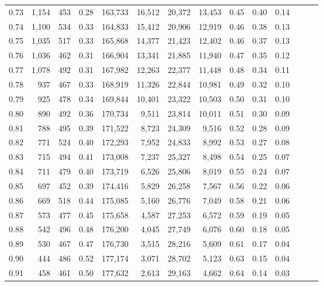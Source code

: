 \begin{tabular}{rrrrrrrrrrrrrr}
0.73 &  1,154 &  453 &  0.28 &  163,733 &   16,512 &  20,372 &  13,453 &  0.45 &  0.40 &      0.14 \\
0.74 &  1,100 &  534 &  0.33 &  164,833 &   15,412 &  20,906 &  12,919 &  0.46 &  0.38 &      0.13 \\
0.75 &  1,035 &  517 &  0.33 &  165,868 &   14,377 &  21,423 &  12,402 &  0.46 &  0.37 &      0.13 \\
0.76 &  1,036 &  462 &  0.31 &  166,904 &   13,341 &  21,885 &  11,940 &  0.47 &  0.35 &      0.12 \\
0.77 &  1,078 &  492 &  0.31 &  167,982 &   12,263 &  22,377 &  11,448 &  0.48 &  0.34 &      0.11 \\
0.78 &    937 &  467 &  0.33 &  168,919 &   11,326 &  22,844 &  10,981 &  0.49 &  0.32 &      0.10 \\
0.79 &    925 &  478 &  0.34 &  169,844 &   10,401 &  23,322 &  10,503 &  0.50 &  0.31 &      0.10 \\
0.80 &    890 &  492 &  0.36 &  170,734 &    9,511 &  23,814 &  10,011 &  0.51 &  0.30 &      0.09 \\
0.81 &    788 &  495 &  0.39 &  171,522 &    8,723 &  24,309 &   9,516 &  0.52 &  0.28 &      0.09 \\
0.82 &    771 &  524 &  0.40 &  172,293 &    7,952 &  24,833 &   8,992 &  0.53 &  0.27 &      0.08 \\
0.83 &    715 &  494 &  0.41 &  173,008 &    7,237 &  25,327 &   8,498 &  0.54 &  0.25 &      0.07 \\
0.84 &    711 &  479 &  0.40 &  173,719 &    6,526 &  25,806 &   8,019 &  0.55 &  0.24 &      0.07 \\
0.85 &    697 &  452 &  0.39 &  174,416 &    5,829 &  26,258 &   7,567 &  0.56 &  0.22 &      0.06 \\
0.86 &    669 &  518 &  0.44 &  175,085 &    5,160 &  26,776 &   7,049 &  0.58 &  0.21 &      0.06 \\
0.87 &    573 &  477 &  0.45 &  175,658 &    4,587 &  27,253 &   6,572 &  0.59 &  0.19 &      0.05 \\
0.88 &    542 &  496 &  0.48 &  176,200 &    4,045 &  27,749 &   6,076 &  0.60 &  0.18 &      0.05 \\
0.89 &    530 &  467 &  0.47 &  176,730 &    3,515 &  28,216 &   5,609 &  0.61 &  0.17 &      0.04 \\
0.90 &    444 &  486 &  0.52 &  177,174 &    3,071 &  28,702 &   5,123 &  0.63 &  0.15 &      0.04 \\
0.91 &    458 &  461 &  0.50 &  177,632 &    2,613 &  29,163 &   4,662 &  0.64 &  0.14 &      0.03 \\

\end{tabular}
